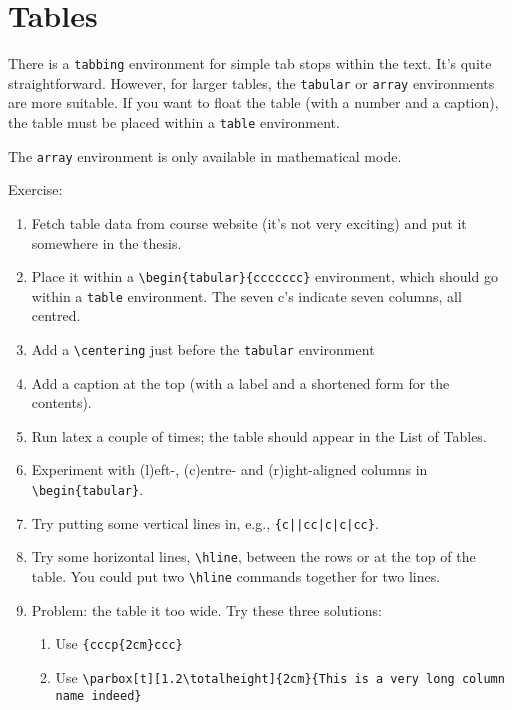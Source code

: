 \documentclass[a4paper]{article}
\begin{document}
\section{Tables}

There is a \verb=tabbing= environment for simple tab stops within the text. It's quite straightforward. However, for larger tables, the \verb=tabular= or \verb=array= environments are more suitable. If you want to float the table (with a number and a caption), the table must be placed within a \verb=table= environment.

The \verb=array= environment is only available in mathematical mode.

Exercise:
\begin{enumerate}
  \item Fetch table data from course website (it's not very exciting) and put it somewhere in the thesis.
  \item Place it within a \verb=\begin{tabular}{ccccccc}= environment, which should go within a \verb=table= environment. The seven c's indicate seven columns, all centred.
  \item Add a \verb=\centering= just before the \verb=tabular= environment
  \item Add a caption at the top (with a label and a shortened form for the contents).
  \item Run latex a couple of times; the table should appear in the List of Tables.
  \item Experiment with (l)eft-, (c)entre- and (r)ight-aligned columns in \verb=\begin{tabular}=.
  \item Try putting some vertical lines in, e.g., \verb={c||cc|c|c|cc}=.
  \item Try some horizontal lines, \verb=\hline=, between the rows or at the top of the table. You could put two \verb=\hline= commands together for two lines.
  \item Problem: the table it too wide. Try these three solutions:
	\begin{enumerate}
	    \item Use \verb={cccp{2cm}ccc}=
	    \item Use \verb=\parbox[t][1.2\totalheight]{2cm}{This is a very long column name indeed}= 
	    

\end{enumerate}
\end{enumerate}
\end{document}
